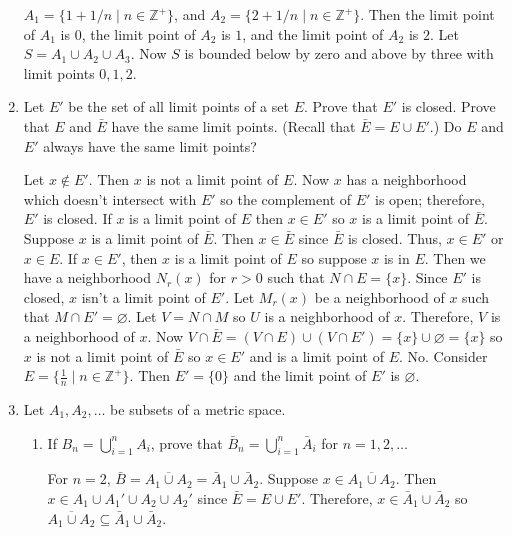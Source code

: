 \begin{enumerate}
  \(A_1 = \{1 + 1/n\mid n\in\mathbb{Z}^+\}\), and
  \(A_2 = \{2 + 1/n\mid n\in\mathbb{Z}^+\}\).
  Then the limit point of \(A_1\) is \(0\), the limit point of \(A_2\) is
  \(1\), and the limit point of \(A_2\) is \(2\).
  Let \(S = A_1\cup A_2\cup A_3\).
  Now \(S\) is bounded below by zero and above by three with limit points
  \(0,1,2\).
\item
  Let \(E'\) be the set of all limit points of a set \(E\).
  Prove that \(E'\) is closed.
  Prove that \(E\) and \(\bar{E}\) have the same limit points.
  (Recall that \(\bar{E} = E\cup E'\).)
  Do \(E\) and \(E'\) always have the same limit points?
  \par\smallskip
  Let \(x\not\in E'\).
  Then \(x\) is not a limit point of \(E\).
  Now \(x\) has a neighborhood which doesn't intersect with \(E'\) so the
  complement of \(E'\) is open; therefore, \(E'\) is closed.
  If \(x\) is a limit point of \(E\) then \(x\in E'\) so \(x\) is a limit point
  of \(\bar{E}\).
  Suppose \(x\) is a limit point of \(\bar{E}\).
  Then \(x\in\bar{E}\) since \(\bar{E}\) is closed.
  Thus, \(x\in E'\) or \(x\in E\).
  If \(x\in E'\), then \(x\) is a limit point of \(E\) so suppose \(x\) is in
  \(E\).
  Then we have a neighborhood \(N_r(x)\) for \(r > 0\) such that
  \(N\cap E = \{x\}\).
  Since \(E'\) is closed, \(x\) isn't a limit point of \(E'\).
  Let \(M_r(x)\) be a neighborhood of \(x\) such that
  \(M\cap E' = \varnothing\).
  Let \(V = N\cap M\) so \(U\) is a neighborhood of \(x\).
  Therefore, \(V\) is a neighborhood of \(x\).
  Now
  \(V\cap\bar{E} = (V\cap E)\cup (V\cap E') = \{x\}\cup\varnothing = \{x\}\) so
  \(x\) is not a limit point of \(\bar{E}\) so \(x\in E'\) and is a limit point
  of \(E\).
  No.
  Consider \(E = \{\frac{1}{n}\mid n\in\mathbb{Z}^+\}\).
  Then \(E' = \{0\}\) and the limit point of \(E'\) is \(\varnothing\).
\item
  Let \(A_1, A_2, \ldots\) be subsets of a metric space.
  \begin{enumerate}[label = (\alph*), ref = \theenumi{} (\alph*)]
  \item
    \label{1.7.a}
    If \(B_n = \bigcup_{i = 1}^nA_i\), prove that
    \(\bar{B}_n = \bigcup_{i = 1}^n\bar{A}_i\) for \(n = 1, 2, \ldots\)
    \par\smallskip
    For \(n = 2\), \(\bar{B} = \overline{A_1\cup A_2} =
    \bar{A}_1\cup \bar{A}_2\).
    Suppose \(x\in\overline{A_1 \cup A_2}\).
    Then \(x\in A_1\cup A_1'\cup A_2\cup A_2'\) since \(\bar{E} = E\cup E'\).
    Therefore, \(x\in\bar{A}_1\cup\bar{A}_2\) so
    \(\overline{A_1\cup A_2}\subseteq\bar{A}_1\cup \bar{A}_2\).

\end{enumerate}
\end{enumerate}
